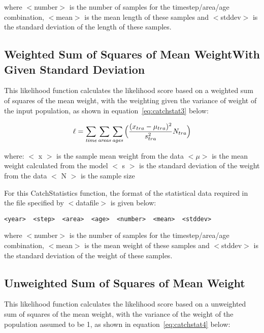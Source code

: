 \documentclass[10pt,twoside]{book}
\begin{document}
where $<$number$>$ is the number of samples for the timestep/area/age combination, $<$mean$>$ is the mean length of these samples and $<$stddev$>$ is the standard deviation of the length of these samples.

\subsection{Weighted Sum of Squares of Mean Weight\newline With Given Standard Deviation}
This likelihood function calculates the likelihood score based on a weighted sum of squares of the mean weight, with the weighting given the variance of weight of the input population, as shown in equation~\ref{eq:catchstat3} below:

\begin{equation}\label{eq:catchstat3}
\ell = \sum_{\it time}\sum_{\it areas}\sum_{\it ages} \Big(\frac{(x_{tra}-\mu_{tra})^2} {s_{tra}^2} N_{tra}\Big)
\end{equation}

where:\newline
$<$ x $>$ is the sample mean weight from the data\newline
$<\mu>$ is the mean weight calculated from the model\newline
$<$ s $>$ is the standard deviation of the weight from the data\newline
$<$ N $>$ is the sample size

\newpage %
For this CatchStatistics function, the format of the statistical data required in the file specified by $<$datafile$>$ is given below:

{\small\begin{verbatim}
<year>  <step>  <area>  <age>  <number>  <mean>  <stddev>
\end{verbatim}}

where $<$number$>$ is the number of samples for the timestep/area/age combination, $<$mean$>$ is the mean weight of these samples and $<$stddev$>$ is the standard deviation of the weight of these samples.

\subsection{Unweighted Sum of Squares of Mean Weight}
This likelihood function calculates the likelihood score based on a unweighted sum of squares of the mean weight, with the variance of the weight of the population assumed to be 1, as shown in equation~\ref{eq:catchstat4} below:
\end{document}
